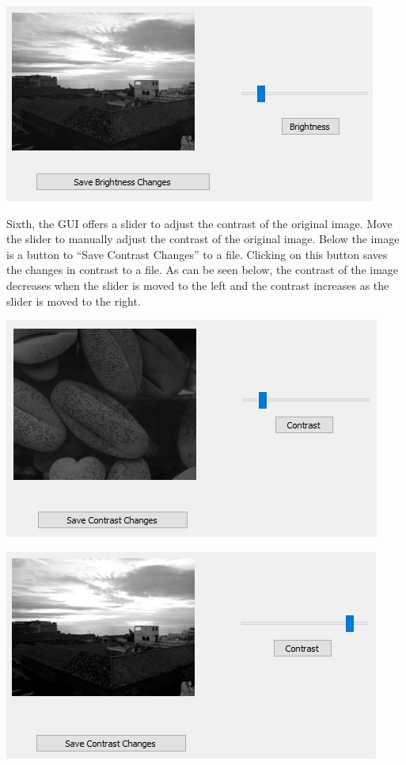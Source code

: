 \documentclass{article}
\newenvironment{Figure}
  {\par\medskip\noindent\ignorespaces\minipage{\linewidth}}
  {\endminipage\par\medskip}
\begin{document}
\begin{multicols*}{2}
\begin{Figure}
 \centering
 \includegraphics[width=\linewidth]{BrightnessImage2.jpg}
\end{Figure}

Sixth, the GUI offers a slider to adjust the contrast of the original image. Move the slider to manually adjust the contrast of the original image. Below the image is a button to “Save Contrast Changes” to a file. Clicking on this button saves the changes in contrast to a file. As can be seen below, the contrast of the image decreases when the slider is moved to the left and the contrast increases as the slider is moved to the right.

\begin{Figure}
 \centering
 \includegraphics[width=\linewidth]{ContrastImage.jpg}
\end{Figure}

\begin{Figure}
 \centering
 \includegraphics[width=\linewidth]{ContrastImage2.jpg}
\end{Figure}



\end{multicols*}
\end{document}
